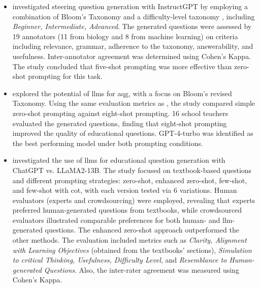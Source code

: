 \begin{itemize}
    \item \cite{elkins_how_2023} investigated steering question generation with InstructGPT \cite{ouyang_training_2022} by employing a combination of Bloom's Taxonomy and a difficulty-level taxonomy \cite{perez_automatic_2012}, including \textit{Beginner, Intermediate, Advanced}. The generated questions were assessed by 19 annotators (11 from biology and 8 from machine learning) on criteria including relevance, grammar, adherence to the taxonomy, answerability, and usefulness. Inter-annotator agreement was determined using Cohen's Kappa. The study concluded that five-shot prompting was more effective than zero-shot prompting for this task.
    \item \cite{maity_can_2025} explored the potential of \ac{llms} for \ac{aqg}, with a focus on Bloom's revised Taxonomy. Using the same evaluation metrics as \cite{elkins_how_2023}, the study compared simple zero-shot prompting against eight-shot prompting. 16 school teachers evaluated the generated questions, finding that eight-shot prompting improved the quality of educational questions. GPT-4-turbo was identified as the best performing model under both prompting conditions. 
    \item \cite{al_faraby_analysis_2024} investigated the use of \ac{llms} for educational question generation with ChatGPT vs. LLaMA2-13B. The study focused on textbook-based questions and different prompting strategies: zero-shot, enhanced zero-shot, few-shot, and few-shot with \ac{cot}, with each version tested via 6 variations. Human evaluators (experts and crowdsourcing) were employed, revealing that experts preferred human-generated questions from textbooks, while crowdsourced evaluators illustrated comparable preferences for both human- and \ac{llm}-generated questions. The enhanced zero-shot approach outperformed the other methods. The evaluation included metrics such as \textit{Clarity, Alignment with Learning Objectives} (obtained from the textbooks' sections), \textit{Simulation to critical Thinking, Usefulness, Difficulty Level}, and \textit{Resemblance to Human-generated Questions}. Also, the inter-rater agreement was measured using Cohen's Kappa.

\end{itemize}
